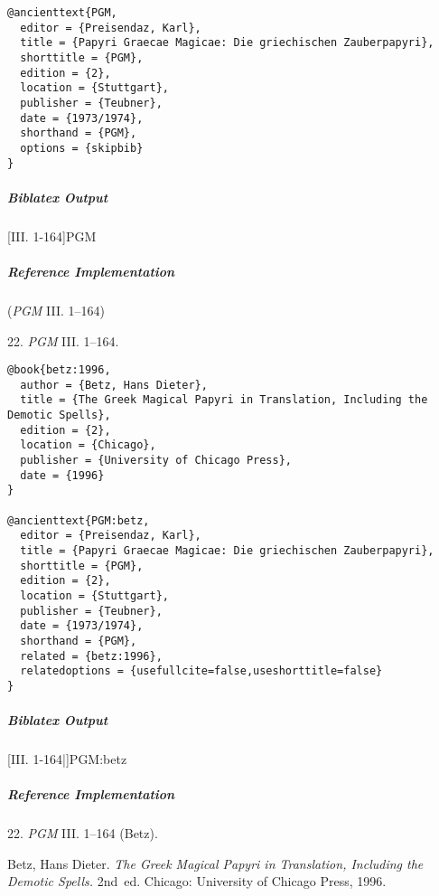 \documentclass[a4paper]{article}
\newenvironment{biboutput}{%
  \subparagraph{Biblatex Output}
}{\color{black}}
\newenvironment{refimp}{%
  \subparagraph{Reference Implementation}
  \color{reference-colour}
  \rm
}{\par\color{black}}
\begin{document}
\begin{lstlisting}
@ancienttext{PGM,
  editor = {Preisendaz, Karl},
  title = {Papyri Graecae Magicae: Die griechischen Zauberpapyri},
  shorttitle = {PGM},
  edition = {2},
  location = {Stuttgart},
  publisher = {Teubner},
  date = {1973/1974},
  shorthand = {PGM},
  options = {skipbib}
}
\end{lstlisting}

\begin{biboutput}
  [III. 1-164]{PGM}
\end{biboutput}

\begin{refimp}
  (\emph{PGM} III. 1–164)

  \hspace*{\bibindent}22. \emph{PGM} III. 1–164.

\end{refimp}

\medskip

\begin{lstlisting}
@book{betz:1996,
  author = {Betz, Hans Dieter},
  title = {The Greek Magical Papyri in Translation, Including the Demotic Spells},
  edition = {2},
  location = {Chicago},
  publisher = {University of Chicago Press},
  date = {1996}
}

@ancienttext{PGM:betz,
  editor = {Preisendaz, Karl},
  title = {Papyri Graecae Magicae: Die griechischen Zauberpapyri},
  shorttitle = {PGM},
  edition = {2},
  location = {Stuttgart},
  publisher = {Teubner},
  date = {1973/1974},
  shorthand = {PGM},
  related = {betz:1996},
  relatedoptions = {usefullcite=false,useshorttitle=false}
}
\end{lstlisting}

\begin{biboutput}
  [III. 1-164|]{PGM:betz}
\end{biboutput}

\begin{refimp}
  \hspace*{\bibindent}22. \emph{PGM} III. 1–164 (Betz).

  \hangindent\bibindent Betz, Hans Dieter. \emph{The Greek Magical Papyri in
  Translation, Including the Demotic Spells.} 2nd~ed. Chicago: University of
  Chicago Press, 1996.

\end{refimp}
\end{document}
